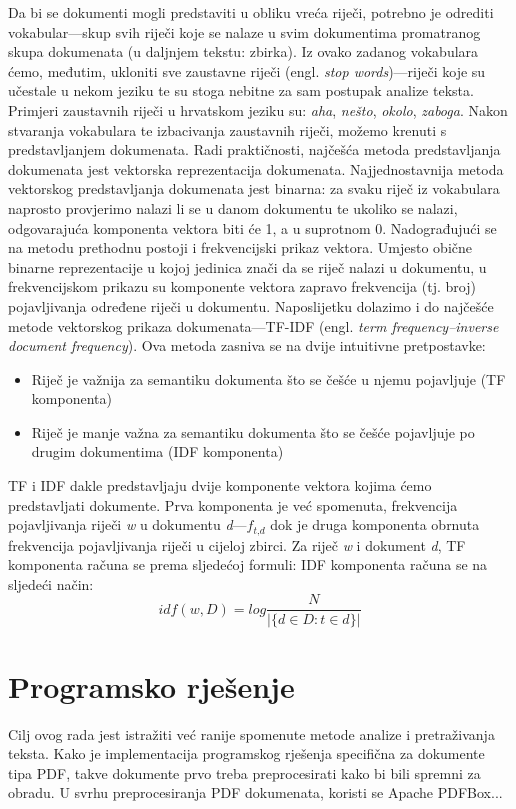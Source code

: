 \documentclass[times, utf8, zavrsni]{fer}
\begin{document}
Da bi se dokumenti mogli predstaviti u obliku vreća riječi, potrebno je odrediti vokabular—skup svih riječi koje se nalaze u svim dokumentima promatranog skupa dokumenata (u daljnjem tekstu: zbirka). Iz ovako zadanog vokabulara ćemo, međutim, ukloniti sve zaustavne riječi (engl. \textit{stop words})—riječi koje su učestale u nekom jeziku te su stoga nebitne za sam postupak analize teksta. Primjeri zaustavnih riječi u hrvatskom jeziku su: \textit{aha}, \textit{nešto}, \textit{okolo}, \textit{zaboga}.
Nakon stvaranja vokabulara te izbacivanja zaustavnih riječi, možemo krenuti s predstavljanjem dokumenata. Radi praktičnosti, najčešća metoda predstavljanja dokumenata jest vektorska reprezentacija dokumenata.
Najjednostavnija metoda vektorskog predstavljanja dokumenata jest binarna: za svaku riječ iz vokabulara naprosto provjerimo nalazi li se u danom dokumentu te ukoliko se nalazi, odgovarajuća komponenta vektora biti će 1, a u suprotnom 0. Nadograđujući se na metodu prethodnu postoji i frekvencijski prikaz vektora. Umjesto obične binarne reprezentacije u kojoj jedinica znači da se riječ nalazi u dokumentu, u frekvencijskom prikazu su komponente vektora zapravo frekvencija (tj. broj) pojavljivanja određene riječi u dokumentu. Naposlijetku dolazimo i do najčešće metode vektorskog prikaza dokumenata—TF-IDF (engl. \textit{term frequency–inverse document frequency}). Ova metoda zasniva se na dvije intuitivne pretpostavke:
\begin{itemize}
\item Riječ je važnija za semantiku dokumenta što se češće u njemu pojavljuje (TF komponenta)
\item Riječ je manje važna za semantiku dokumenta što se češće pojavljuje po drugim dokumentima (IDF komponenta)
\end{itemize}
TF i IDF dakle predstavljaju dvije komponente vektora kojima ćemo predstavljati dokumente. Prva komponenta je već spomenuta, frekvencija pojavljivanja riječi \textit{w} u dokumentu \textit{d}—$f_\textit{t,d}$ dok je druga komponenta obrnuta frekvencija pojavljivanja riječi u cijeloj zbirci.
Za riječ \textit{w} i dokument \textit{d}, TF komponenta računa se prema sljedećoj formuli:
IDF komponenta računa se na sljedeći način:
\[ idf(w, D) = log\frac{N}{|\{d \in D:t \in d\}|} \]

\chapter{Programsko rješenje}
Cilj ovog rada jest istražiti već ranije spomenute metode analize i pretraživanja teksta.	Kako je implementacija programskog rješenja specifična za dokumente tipa PDF, takve dokumente prvo treba preprocesirati kako bi bili spremni za obradu. U svrhu preprocesiranja PDF dokumenata, koristi se Apache PDFBox...
\end{document}
